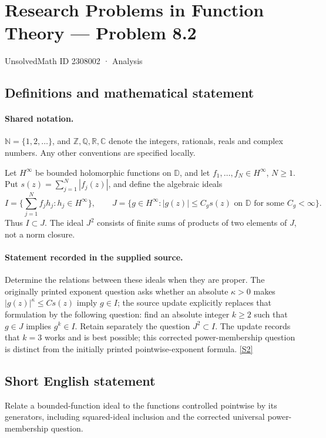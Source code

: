\documentclass[11pt]{article}
\newcommand{\sref}[2]{\hyperlink{source:#1:#2}{[S#2]}}
\begin{document}
\setcounter{section}{2308001}
\section{Research Problems in Function Theory — Problem 8.2}\label{2308002}
{\small\sffamily UnsolvedMath ID 2308002 · Analysis}
\subsection{Definitions and mathematical statement}

\paragraph{Shared notation.}$\mathbb N=\{1,2,\ldots\}$, and $\mathbb Z,\mathbb Q,\mathbb R,\mathbb C$ denote the integers, rationals, reals and complex numbers. Any other conventions are specified locally.


Let $H^\infty$ be bounded holomorphic functions on $\mathbb D$, and let $f_1,\ldots,f_N\in H^\infty$, $N\ge1$. Put $s(z)=\sum_{j=1}^N|f_j(z)|$, and define the algebraic ideals
\[I=\{\sum_{j=1}^Nf_jh_j:h_j\in H^\infty\},\qquad
J=\{g\in H^\infty: |g(z)|\le C_gs(z)\text{ on }\mathbb D
\text{ for some }C_g<\infty\}.
\]
Thus $I\subset J$. The ideal $J^2$ consists of finite sums of products of two elements of $J$, not a norm closure.
\paragraph{Statement recorded in the supplied source.}
Determine the relations between these ideals when they are proper. The originally printed exponent question asks whether an absolute $\kappa>0$ makes $|g(z)|^\kappa\le C s(z)$ imply $g\in I$; the source update explicitly replaces that formulation by the following question: find an absolute integer $k\ge2$ such that $g\in J$ implies $g^k\in I$. Retain separately the question $J^2\subset I$. The update records that $k=3$ works and is best possible; this corrected power-membership question is distinct from the initially printed pointwise-exponent formula. \sref{2308002}{2}
\subsection{Short English statement}
Relate a bounded-function ideal to the functions controlled pointwise by its generators, including squared-ideal inclusion and the corrected universal power-membership question.
\end{document}
